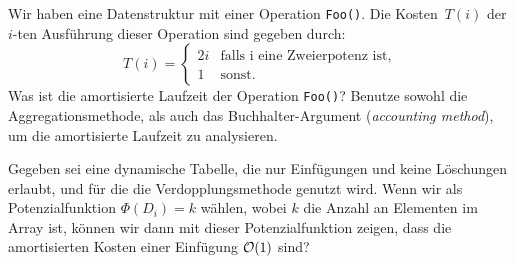 \documentclass{uebung_cs}
\begin{document}
\begin{exercise}
	Wir haben eine Datenstruktur mit einer Operation \texttt{Foo()}. Die Kosten~$T(i)$ der $i$-ten Ausführung dieser Operation sind gegeben durch: 
	\[T(i) = \begin{cases} 2i & \text{falls i eine Zweierpotenz ist}, \\ 1 & \text{sonst}. \end{cases}\] 
	Was ist die amortisierte Laufzeit der Operation \texttt{Foo()}? Benutze sowohl die Aggregationsmethode, als auch das Buchhalter-Argument (\textit{accounting method}), um die amortisierte Laufzeit zu analysieren.
\end{exercise}    

\begin{exercise}
	Gegeben sei eine dynamische Tabelle, die nur Einfügungen und keine Löschungen erlaubt, und für die die Verdopplungsmethode genutzt wird. Wenn wir als Potenzialfunktion $\Phi(D_i) = k$ wählen, wobei $k$ die Anzahl an Elementen im Array ist, können wir dann mit dieser Potenzialfunktion zeigen, dass die amortisierten Kosten einer Einfügung $\mathcal{O}(1)$ sind?
\end{exercise}
\end{document}
